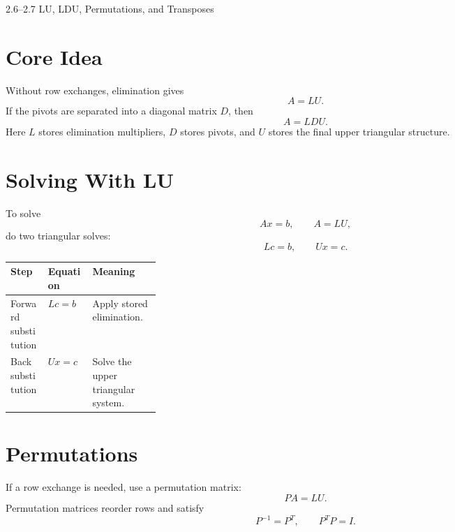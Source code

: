\documentclass[10pt]{article}
\begin{document}
\begin{center}
{\LARGE 2.6--2.7 LU, LDU, Permutations, and Transposes\par}
\end{center}

\section{Core Idea}


Without row exchanges, elimination gives
\[
A=LU.
\]
If the pivots are separated into a diagonal matrix \(D\), then
\[
A=LDU.
\]
Here \(L\) stores elimination multipliers, \(D\) stores pivots, and \(U\) stores the final upper triangular structure.

\section{Solving With LU}

To solve
\[
Ax=b,
\qquad A=LU,
\]
do two triangular solves:
\[
Lc=b,
\qquad
Ux=c.
\]

\begin{center}
\small
\begin{tabularx}{\linewidth}{@{}L{0.25\linewidth}Y Y@{}}
\toprule
Step & Equation & Meaning \\
\midrule
Forward substitution & \(Lc=b\) & Apply stored elimination. \\
Back substitution & \(Ux=c\) & Solve the upper triangular system. \\
\bottomrule
\end{tabularx}
\end{center}


\section{Permutations}

If a row exchange is needed, use a permutation matrix:
\[
PA=LU.
\]
Permutation matrices reorder rows and satisfy
\[
P^{-1}=P^{T},
\qquad
P^{T}P=I.
\]
\end{document}

